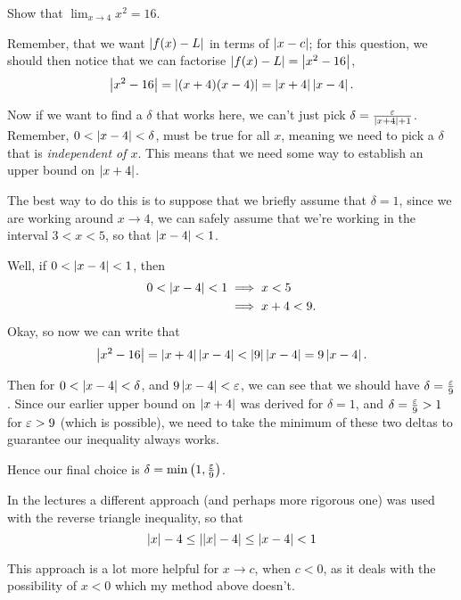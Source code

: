 \documentclass[12pt]{article}
\theoremstyle{definition}
\begin{document}
            \begin{eg}
                Show that $\lim_{x \rightarrow 4}x^{2} = 16$.

                Remember, that we want $\left|f(x) - L\right|$ in terms of $\left|x - c\right|$; for this question, we should then notice that we can factorise $\left|f(x) - L\right| = \left|x^{2} - 16\right|$,
                \begin{equation*}
                    \left|x^{2} - 16\right| = \left|(x + 4)(x - 4)\right| = \left|x + 4\right|\left|x - 4\right|.
                \end{equation*}

                Now if we want to find a $\delta$ that works here, we can't just pick $\delta = \frac{\varepsilon}{\left|x + 4\right| + 1}$. Remember, $0 < \left|x - 4\right| < \delta$, must be true for all $x$, meaning we need to pick a $\delta$ that is \emph{independent of $x$}. This means that we need some way to establish an upper bound on $\left|x + 4\right|$.

                The best way to do this is to suppose that we briefly assume that $\delta = 1$, since we are working around $x \rightarrow 4$, we can safely assume that we're working in the interval $3 < x < 5$, so that $\left|x - 4\right| < 1$. 

                Well, if $0 < \left|x - 4\right| < 1$, then
                \begin{align*}
                    0 < \left|x - 4\right| < 1 &\implies x < 5 \\
                                        &\implies x + 4 < 9.
                \end{align*}
                Okay, so now we can write that 
                \begin{equation*}
                    \left|x^{2} - 16\right| = \left|x + 4\right|\left|x - 4\right| < \left|9\right|\left|x - 4\right| = 9\left|x - 4\right|.
                \end{equation*}

                Then for $0 < \left|x - 4\right| < \delta$, and $9\left|x - 4\right| < \varepsilon$, we can see that we should have $\delta = \frac{\varepsilon}{9}$. Since our earlier upper bound on $\left|x + 4\right|$ was derived for $\delta = 1$, and $\delta = \frac{\varepsilon}{9} > 1$ for $\varepsilon > 9$ (which is possible), we need to take the minimum of these two deltas to guarantee our inequality always works. 

                Hence our final choice is $\delta = \min\left(1, \frac{\varepsilon}{9}\right)$.
            \end{eg}
            \begin{note}
                In the lectures a different approach (and perhaps more rigorous one) was used with the reverse triangle inequality, so that 
                \begin{equation*}
                    \left|x\right| - 4 \leq \left|\left|x\right| - 4\right| \leq \left|x - 4\right| < 1
                \end{equation*}

                This approach is a lot more helpful for $x \rightarrow c$, when $c < 0$, as it deals with the possibility of $x < 0$ which my method above doesn't.
            \end{note}
\end{document}
